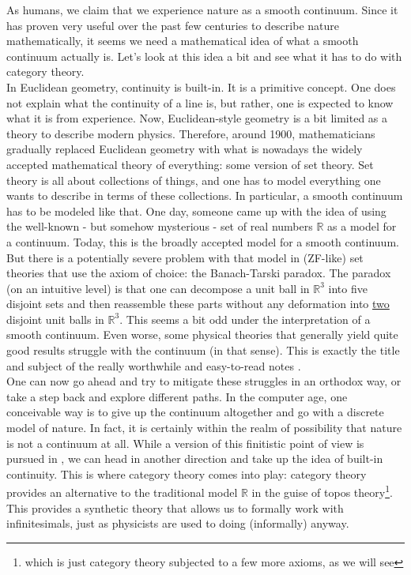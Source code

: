 As humans, we claim that we experience nature as a smooth continuum.
Since it has proven very useful over the past few centuries to describe nature mathematically, it seems we need a mathematical idea of what a smooth continuum actually is.
Let's look at this idea a bit and see what it has to do with category theory.
\\
In Euclidean geometry, continuity is built-in.
It is a primitive concept.
One does not explain what the continuity of a line is, but rather, one is expected to know what it is from experience.
Now, Euclidean-style geometry is a bit limited as a theory to describe modern physics.
Therefore, around 1900, mathematicians gradually replaced Euclidean geometry with what is nowadays the widely accepted mathematical theory of everything: some version of set theory.
Set theory is all about collections of things, and one has to model everything one wants to describe in terms of these collections.
In particular, a smooth continuum has to be modeled like that.
One day, someone came up with the idea of using the well-known - but somehow mysterious - set of real numbers $\mathbb{R}$ as a model for a continuum.
Today, this is the broadly accepted model for a smooth continuum.
\\
But there is a potentially severe problem with that model in (ZF-like) set theories that use the axiom of choice: the Banach-Tarski paradox.
The paradox (on an intuitive level) is that one can decompose a unit ball in $\mathbb{R}^{3}$ into five disjoint sets and then reassemble these parts without any {\glqq}deformation{\grqq} into \underline{two} disjoint unit balls in $\mathbb{R}^{3}$.
This seems a bit odd under the interpretation of a smooth continuum.
Even worse, some physical theories that generally yield quite good results struggle with the continuum (in that sense). This is exactly the title and subject of the really worthwhile and easy-to-read notes \cite{476fe2a3}.
\\
One can now go ahead and try to mitigate these struggles in an orthodox way, or take a step back and explore different paths.
In the computer age, one conceivable way is to give up the continuum altogether and go with a discrete model of nature.
In fact, it is certainly within the realm of possibility that nature is not a continuum at all.
While a version of this finitistic point of view is pursued in \cite{0b855cc5}, we can head in another direction and take up the idea of built-in continuity.
This is where category theory comes into play: category theory provides an alternative to the traditional model $\mathbb{R}$ in the guise of topos theory\footnote{which is just category theory subjected to a few more axioms, as we will see}. This provides a synthetic theory that allows us to formally work with infinitesimals, just as physicists are used to doing (informally) anyway.
